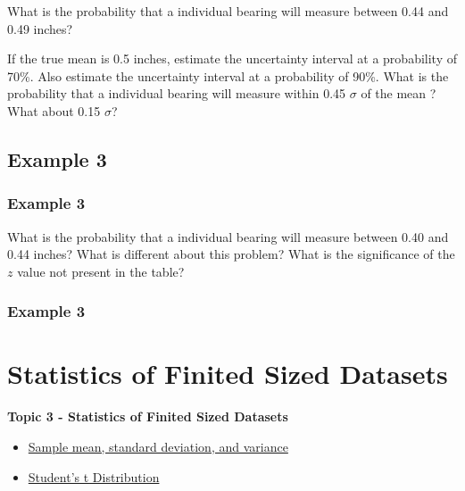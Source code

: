 \documentclass[fleqn]{ltx-talk} %
\newcommand{\sectionIVtitle}{Statistics of Finited Sized Datasets}
\newcommand{\sectionIIIsubsectionIVtitle}{Example 3}
\newcommand{\sectionIVsubsectionItitle}{Sample mean, standard deviation, and variance}
\newcommand{\sectionIVsubsectionIItitle}{Student's t Distribution}
\begin{document}
			\begin{frame}

		What is the probability that a individual bearing will measure between 0.44 and 0.49 inches? 

			\end{frame}

			\begin{frame}

				If the true mean is 0.5 inches, estimate the uncertainty interval at a probability of 70\%. Also estimate the uncertainty interval at a probability of 90\%.
	What is the probability that a individual bearing will measure within 0.45 $\sigma$ of the mean ? What about 0.15 $\sigma$? \\


			\end{frame}

		\subsection{\sectionIIIsubsectionIVtitle}\label{sectionIIIsubsectionIV}	

			\begin{frame}
				\frametitle{\sectionIIIsubsectionIVtitle}

				What is the probability that a individual bearing will measure between 0.40 and 0.44 inches? What is different about this problem? What is the significance of the $z$ value not present in the table?		


			\end{frame}

			\begin{frame}
				\frametitle{\sectionIIIsubsectionIVtitle}
				


			\end{frame}

	\section{\sectionIVtitle}\label{sectionIV}

		\begin{frame}
			\large \textbf{Topic 3 - \sectionIVtitle} \vspace{3mm}\\

			\begin{itemize}
				\item \hyperref[sectionIVsubsectionI]{\sectionIVsubsectionItitle} \vspc %
				\item \hyperref[sectionIVsubsectionII]{\sectionIVsubsectionIItitle} \vspc %
			\end{itemize}

		\end{frame}
\end{document}
